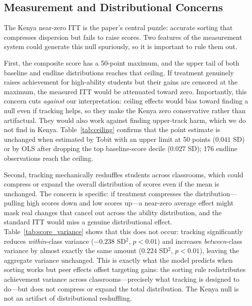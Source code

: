 \documentclass[11pt]{article}
\begin{document}
\subsection{Measurement and Distributional Concerns}

The Kenya near-zero ITT is the paper's central puzzle: accurate sorting that compresses dispersion but fails to raise scores. Two features of the measurement system could generate this null spuriously, so it is important to rule them out.

First, the composite score has a 50-point maximum, and the upper tail of both baseline and endline distributions reaches that ceiling. If treatment genuinely raises achievement for high-ability students but their gains are censored at the maximum, the measured ITT would be attenuated toward zero. Importantly, this concern cuts \emph{against} our interpretation: ceiling effects would bias toward finding a null even if tracking helps, so they make the Kenya zero conservative rather than artifactual. They would also work against finding upper-track harm, which we do not find in Kenya. Table~\ref{tab:ceiling} confirms that the point estimate is unchanged when estimated by Tobit with an upper limit at 50 points ($0.041$ SD) or by OLS after dropping the top baseline-score decile ($0.027$ SD); 176 endline observations reach the ceiling.

Second, tracking mechanically reshuffles students across classrooms, which could compress or expand the overall distribution of scores even if the mean is unchanged. The concern is specific: if treatment compresses the distribution---pulling high scores down and low scores up---a near-zero average effect might mask real changes that cancel out across the ability distribution, and the standard ITT would miss a genuine distributional effect. Table~\ref{tab:score_variance} shows that this does not occur: tracking significantly reduces \emph{within}-class variance ($-0.238$ SD$^2$, $p<0.01$) and increases \emph{between}-class variance by almost exactly the same amount ($0.224$ SD$^2$, $p<0.01$), leaving the aggregate variance unchanged. This is exactly what the model predicts when sorting works but peer effects offset targeting gains: the sorting rule redistributes achievement variance across classrooms---precisely what tracking is designed to do---but does not compress or expand the total distribution. The Kenya null is not an artifact of distributional reshuffling.

\end{document}
